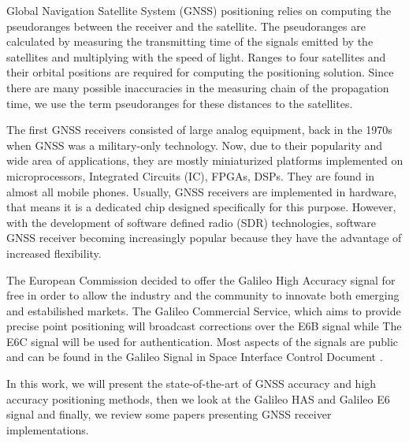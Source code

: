 
Global Navigation Satellite System (GNSS) positioning relies on computing the pseudoranges between the receiver and the satellite. The pseudoranges are calculated by measuring the transmitting time of the signals emitted by the satellites and multiplying with the speed of light. Ranges to four satellites and their orbital positions are required for computing the positioning solution. Since there are many possible inaccuracies in the measuring chain of the propagation time, we use the term pseudoranges for these distances to the satellites.

The first GNSS receivers consisted of large analog equipment, back in the 1970s when GNSS was a military-only technology\cite{receivers}. Now, due to their popularity and wide area of applications, they are mostly miniaturized platforms implemented on microprocessors, Integrated Circuits (IC), FPGAs, DSPs\cite{receivers}. They are found in almost all mobile phones. Usually, GNSS receivers are implemented in hardware, that means it is a dedicated chip designed specifically for this purpose. However, with the development of software defined radio (SDR) technologies, software GNSS receiver becoming increasingly popular because they have the advantage of increased flexibility.

The European Commission decided to offer the Galileo High Accuracy signal for free in order to allow the industry and the community to innovate both emerging and estabilished markets\cite{galileoHasPolicy}. The Galileo Commercial Service, which aims to provide precise point positioning will broadcast corrections over the E6B signal while The E6C signal will be used for authentication\cite{e6breceiver}. Most aspects of the signals are public and can be found in the Galileo Signal in Space Interface Control Document \cite{galileoSisIcd}.

In this work, we will present the state-of-the-art of GNSS accuracy and high accuracy positioning methods, then we look at the Galileo HAS and Galileo E6 signal and finally, we review some papers presenting GNSS receiver implementations.
